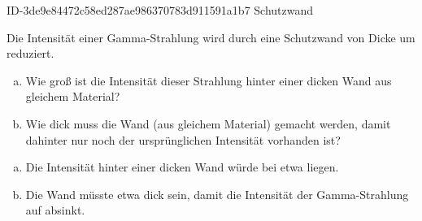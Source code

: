 \begin{exercise}
      {ID-3de9e84472c58ed287ae986370783d911591a1b7}
      {Schutzwand}
  \ifproblem\problem\par
    Die Intensität einer Gamma-Strahlung wird durch eine Schutzwand
    von  Dicke um  reduziert.
    \begin{enumerate}[a)]
      \item Wie groß ist die Intensität dieser Strahlung hinter
            einer  dicken Wand aus gleichem
            Material?
      \item Wie dick muss die Wand (aus gleichem Material) gemacht
            werden, damit dahinter nur noch  der ursprünglichen
            Intensität vorhanden ist?
    \end{enumerate}
  \fi
  \ifoutcome\outcome\par
    \begin{enumerate}[a)]
      \item Die Intensität hinter einer  dicken Wand
            würde bei etwa  liegen.
      \item Die Wand müsste etwa  dick sein, damit die
            Intensität der Gam\-ma-Strah\-lung auf  absinkt.
    \end{enumerate}
  \fi
\end{exercise}
